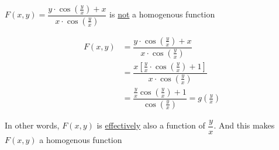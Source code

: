 \documentclass[14pt,fleqn]{extarticle}
\newcommand\trma{\cos \left(\frac{y}{x} \right)}
\begin{document}
 
\begin{snippet}
    
    
    \incorrect
    
		$F(x,y) = \dfrac{y\cdot \trma + x}{x\cdot\trma}$
		is \underline{not} a homogenous function 
		
    \reason
    
    \begin{align}
	F(x,y) &= \dfrac{y\cdot\trma + x}{x\cdot \trma} \\
	&= \dfrac{x \left[\frac{y}{x}\cdot \trma + 1 \right]}{x\cdot\trma} \\
	&= \dfrac{\frac{y}{x}\trma + 1}{\trma} = g \left(\frac{y}{x} \right)
\end{align}

In other words, $F(x,y)$ is \underline{effectively} also a function of $\dfrac{y}{x}$. And this makes $F(x,y)$ a homogenous function
    
\end{snippet} 
\end{document}
